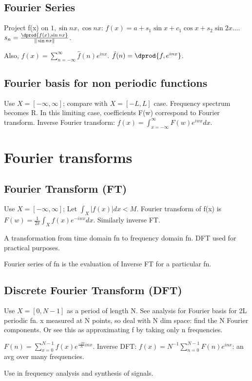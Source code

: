 \documentclass[oneside, article]{memoir}
\begin{document}
\subsection{Fourier Series}
Project f(x) on $1, \sin nx, \cos nx$: $f(x) = a + s_{1} \sin x + c_{1} \cos x + s_{2} \sin 2x \dots$. $s_{n}=\frac{\dprod{f(x), \sin nx}}{\|\sin nx\|}$.

Also, $f(x) = \sum_{n = -\infty}^{\infty} \hat{f}(n)e^{inx}$. $\hat{f}(n) = \dprod{f, e^{inx}}$.

\subsection{Fourier basis for non periodic functions}
Use $X = [-\infty, \infty]$; compare with $X = [-L, L]$ case. Frequency spectrum becomes R. In this limiting case, coefficients F(w) correspond to Fourier transform. \why Inverse Fourier transform: $f(x) = \int_{x = -\infty}^{\infty} F(w) e^{iwx} dx$. \why

\section{Fourier transforms}
\subsection{Fourier Transform (FT)}
Use $X = [-\infty, \infty]$; Let $\int_{X}|f(x)|dx <M$. Fourier transform of f(x) is $F(w) = \frac{1}{2 \pi} \int_{X} f(x)e^{-iwx} dx$. Similarly inverse FT.

A transformation from time domain fn to frequency domain fn. DFT used for practical purposes.

Fourier series of fn is the evaluation of Inverse FT for a particular fn.

\subsection{Discrete Fourier Transform (DFT)}
Use $X = [0, N-1]$ as a period of length N. See analysis for Fourier basis for 2L periodic fn. x measured at N points, so deal with N dim space: find the N Fourier components.  Or see this as approximating f by taking only n frequencies.

$F(n) = \sum_{x=0}^{N-1} f(x)e^{\frac{-2\pi}{N}inx}$. Inverse DFT: $f(x) = N^{-1}\sum_{n=0}^{N-1} F(n)e^{inx}$: an avg over many frequencies.

Use in frequency analysis and synthesis of signals.
\end{document}
